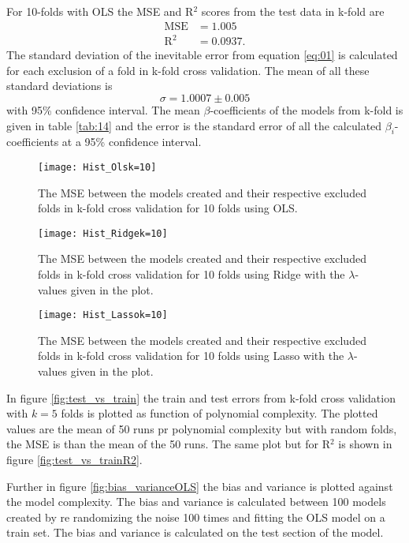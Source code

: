\documentclass[uio,jmp,amsmath,amssymb,reprint,nofootinbib]{revtex4-1}
\numberwithin{equation}{section}
\begin{document}
For 10-folds with OLS the MSE and R\(^2\) scores from the test data in k-fold are
\begin{align*}
\text{MSE} &= 1.005\\
\text{R}^2 &= 0.0937.
\end{align*}
The standard deviation of the inevitable error from equation \ref{eq:01} is calculated for each exclusion of a fold in k-fold cross validation. The mean of all these standard deviations is
\begin{equation}
\sigma = 1.0007 \pm 0.005
\end{equation}
with 95\% confidence interval. The mean \(\beta\)-coefficients of the models from k-fold is given in table \ref{tab:14} and the error is the standard error of all the calculated \(\beta_i\)-coefficients at a 95\% confidence interval. 

\begin{figure}[H]
    \centering
    \texttt{[image: Hist\_Olsk=10]}
    \caption{The MSE between the models created and their respective excluded folds in k-fold cross validation for 10 folds using OLS.}
    \label{fig:K_fold10_OLS}
\end{figure}

\begin{figure}[H]
    \centering
    \texttt{[image: Hist\_Ridgek=10]}
    \caption{The MSE between the models created and their respective excluded folds in k-fold cross validation for 10 folds using Ridge with the \(\lambda\)-values given in the plot.}
    \label{fig:K_fold10_Ridge}
\end{figure}

\begin{figure}[H]
    \centering
    \texttt{[image: Hist\_Lassok=10]}
    \caption{The MSE between the models created and their respective excluded folds in k-fold cross validation for 10 folds using Lasso with the \(\lambda\)-values given in the plot.}
    \label{fig:K_fold10_Lasso}
\end{figure}

In figure \ref{fig:test_vs_train} the train and test errors from k-fold cross validation with \(k=5\) folds is plotted as function of polynomial complexity. The plotted values are the mean of 50 runs pr polynomial complexity but with random folds, the MSE is than the mean of the 50 runs. The same plot but for R\(^2\) is shown in figure \ref{fig:test_vs_trainR2}.

Further in figure \ref{fig:bias_varianceOLS} the bias and variance is plotted against the model complexity. The bias and variance is calculated between 100 models created by re randomizing the noise 100 times and fitting the OLS model on a train set. The bias and variance is calculated on the test section of the model.
\end{document}
